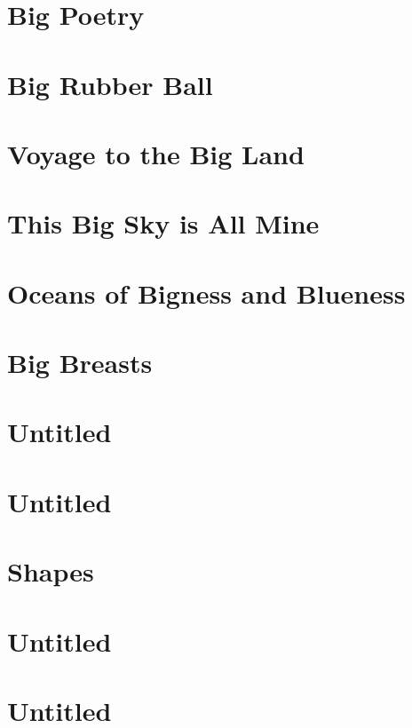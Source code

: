 \chapter{Big Poetry}


\chapter{Big Rubber Ball}


\chapter{Voyage to the Big Land}


\chapter{This Big Sky is All Mine}


\chapter{Oceans of Bigness and Blueness}


\chapter{Big Breasts}


\chapter{Untitled}


\chapter{Untitled}


\chapter{Shapes}


\chapter{Untitled}


\chapter{Untitled}



